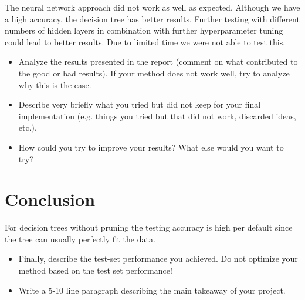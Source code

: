 \documentclass[a4paper, 10pt, conference]{ieeeconf}      %
\begin{document}
The neural network approach did not work as well as expected. Although we have a high accuracy, the decision tree has better results. 
Further testing with different numbers of hidden layers in combination with further hyperparameter tuning could
lead to better results. Due to limited time we were not able to test this. 

{\color{blue}
\begin{itemize}
	\item Analyze the results presented in the report (comment on what contributed to the good or bad results). If your method does not work well, try to analyze why this is the case.
	\item Describe very briefly what you tried but did not keep for your final implementation (e.g. things you tried but that did not work, discarded ideas, etc.).
	\item How could you try to improve your results? What else would you want to try?

\end{itemize}
}

\section{Conclusion}
\label{sec:con}

For decision trees without pruning the testing accuracy is high per default since the tree can usually perfectly fit the data. 

{\color{blue}

  \begin{itemize}
  \item Finally, describe the test-set performance you achieved. Do not
    optimize your method based on the test set performance!
  \item Write a 5-10 line paragraph describing the main takeaway of your project.
  \end{itemize}

}

\end{document}
